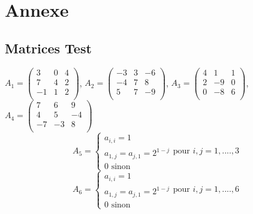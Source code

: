 \chapter*{Annexe}
\label{annexe}
\section*{Matrices Test}
$A_1 = \begin{pmatrix}
    3&0&4\\
    7&4&2\\
    -1&1&2\\
    \end{pmatrix}
    $,
    $A_2 = \begin{pmatrix}
    -3&3&-6\\
    -4&7&8\\
    5&7&-9\\
    \end{pmatrix}
    $,
    $A_3 = \begin{pmatrix}
    4&1&1\\
    2&-9&0\\
    0&-8&6\\
    \end{pmatrix}
    $,
    $A_4 = \begin{pmatrix}
    7&6&9\\
    4&5&-4\\
    -7&-3&8\\
    \end{pmatrix}
    $\vspace{6pt}\\
    \begin{equation*}
        A_5=
        \begin{cases}
            a_{i,i}=1 \\
            a_{1,j}=a_{j,1}=2^{1-j}\\
            0 \text{ sinon}
        \end{cases} \text{pour }i,j=1,....,3
    \end{equation*}
    \begin{equation*}
        A_6=
        \begin{cases}
            a_{i,i}=1 \\
            a_{1,j}=a_{j,1}=2^{1-j}\\
            0 \text{ sinon}
        \end{cases} \text{pour }i,j=1,....,6
    \end{equation*}
